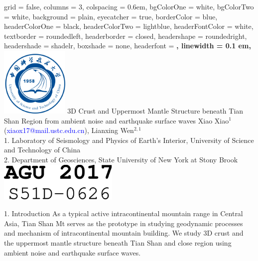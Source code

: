 \documentclass[
    landscape,      %
    paperwidth = 1200mm,
    paperheight = 900mm,
    fontscale = 0.34,
    margin = 1.7cm,
]{baposter}
\begin{document}
\begin{poster}{
    grid = false,            %
    columns = 3,
    colspacing = 0.6em,
    bgColorOne = white,
    bgColorTwo = white,
    background = plain,     %
    eyecatcher = true,      %
    borderColor = blue,
    headerColorOne = black,
    headerColorTwo = lightblue,
    headerFontColor = white,
    textborder = roundedleft,   %
    headerborder = closed,      %
    headershape = roundedright, %
    headershade = shadelr,      %
    boxshade = none,            %
    headerfont = \Large\bf\textsc,
    linewidth = 0.1 em,}
{\includegraphics[height=9em]{USTC_logo_blue.jpg}}
{\huge{3D Crust and Uppermost Mantle Structure beneath Tian Shan Region from ambient noise and earthquake surface waves}}
{
    \vspace{0.3em}
    Xiao Xiao$^1$ (\textcolor{blue}{xiaox17@mail.ustc.edu.cn}),
    Lianxing Wen$^{2,1}$ \\
    \vspace{0.3em}
    1. Laboratory of Seismology and Physics of Earth's Interior, University of Science and Technology of China  \\
    2. Department of Geosciences, State University of New York at Stony Brook  \\
}
{\includegraphics[height=5em]{2017_AGU_ID}}
\vspace{0.4cm}

\begin{posterbox}[column=0, row=0]{1. Introduction}
\setlength{\parskip}{3pt}
As a typical active intracontinental mountain range in Central Asia, Tian
Shan Mt serves as the prototype in studying geodynamic processes and mechanism
of intracontinental mountain building.
We study 3D crust and the uppermost mantle structure beneath Tian Shan and close region
using ambient noise and earthquake surface waves.
\end{posterbox}


\end{poster}
\end{document}
